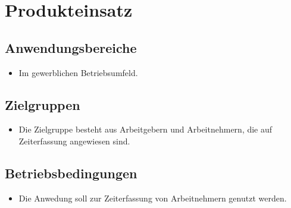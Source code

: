 \section{Produkteinsatz}

\subsection{Anwendungsbereiche}
\begin{itemize}
	\item Im gewerblichen Betriebsumfeld.
\end{itemize}


\subsection{Zielgruppen}
\begin{itemize}
	\item Die Zielgruppe besteht aus Arbeitgebern und Arbeitnehmern, die auf Zeiterfassung angewiesen sind.
\end{itemize}

\subsection{Betriebsbedingungen}
\begin{itemize}
	\item Die Anwedung soll zur Zeiterfassung von Arbeitnehmern genutzt werden.
\end{itemize}
